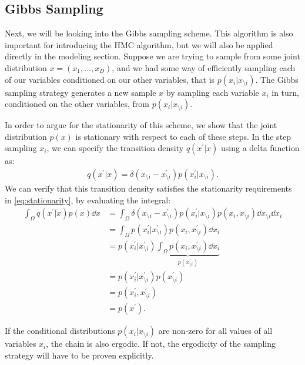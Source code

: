 \subsection{Gibbs Sampling}
Next, we will be looking into the Gibbs sampling scheme.
This algorithm is also important for introducing the HMC algorithm, but we will also be applied directly in the modeling section.
Suppose we are trying to sample from some joint distribution $x=(x_1,\dots, x_D)$, and we had some way of efficiently sampling each of our variables conditioned on our other variables, that is $p(x_i|x_{\setminus i})$.
The Gibbs sampling strategy generates a new sample $x$ by sampling each variable $x_i$ in turn, conditioned on the other variables, from $p(x_i|x_{\setminus i})$.  

In order to argue for the stationarity of this scheme, we show that the joint distribution $p(x)$ is stationary with respect to each of these steps. 
In the step sampling $x_i$, we can specify the transition density $q(x^\prime| x)$ using a delta function as:
\begin{align}
    q(x^\prime| x) = \delta(x_{\setminus i} -x^\prime_{\setminus i}) p(x_i^\prime|x_{\setminus i}).
\end{align}
We can verify that this transition density satisfies the stationarity requirements in \cref{eq:stationarity}, by evaluating the integral:
\begin{align}
    \int_{\Omega} q(x^\prime| x) p(x) \dd{x}  
    &= \int_{\Omega}   \delta(x_{\setminus i} -x^\prime_{\setminus i}) p(x_i^\prime|x_{\setminus i}) p(x_i,x_{\setminus i}) \dd{x_{\setminus i}} \dd{x_i} \\
    &= \int_{\Omega} p(x^\prime_i|x^\prime_{\setminus i}) p(x_i,x^\prime_{\setminus i}) \dd{x_i} \\ 
    &= p(x^\prime_i|x^\prime_{\setminus i}) \underbrace{\int_{\Omega}  p(x_i,x^\prime_{\setminus i}) \dd{x_i}}_{p(x^\prime_{\setminus i})} \\ 
    &= p(x^\prime_i|x^\prime_{\setminus i}) p(x^\prime_{\setminus i})  \\
    &=  p(x^\prime_i,x^\prime_{\setminus i})  \\
    &= p(x^\prime).
\end{align}

If the conditional distributions $p(x_i|x_{\setminus i})$ are non-zero for all values of all variables $x_i$, the chain is also ergodic.
If not, the ergodicity of the sampling strategy will have to be proven explicitly.

